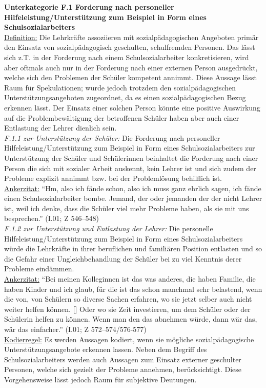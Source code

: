 \textbf{Unterkategorie F.1 Forderung nach personeller Hilfeleistung/Unterstützung zum Beispiel in Form eines Schulsozialarbeiters}\\
\underline{Definition:} Die Lehrkräfte assoziieren mit sozialpädagogischen Angeboten primär den Einsatz von sozialpädagogisch geschulten, schulfremden Personen. Das lässt sich z.T. in der Forderung nach einem Schulsozialarbeiter konkretisieren, wird aber oftmals auch nur in der Forderung nach einer externen Person ausgedrückt, welche sich den Problemen der Schüler kompetent annimmt. Diese Aussage lässt Raum für Spekulationen; wurde jedoch trotzdem den sozialpädagogischen Unterstützungsangeboten zugeordnet, da es einen sozialpädagogischen Bezug erkennen lässt. Der Einsatz einer solchen Person könnte eine positive Auswirkung auf die Problembewältigung der betroffenen Schüler haben aber auch einer Entlastung der Lehrer dienlich sein.\\
\textit{F.1.1 zur Unterstützung der Schüler:} Die Forderung nach personeller Hilfeleistung/Unterstützung zum Beispiel in Form eines Schulsozialarbeiters zur Unterstützung der Schüler und Schülerinnen beinhaltet die Forderung nach einer Person die sich mit sozialer Arbeit auskennt, kein Lehrer ist und sich zudem der Probleme explizit annimmt bzw. bei der Problemlösung behilflich ist.\\
\underline{Ankerzitat:} "`Hm, also ich fände schon, also ich muss ganz ehrlich sagen, ich fände einen Schulsozialarbeiter bombe. Jemand, der oder jemanden der der nicht Lehrer ist, weil ich denke, dass die Schüler viel mehr Probleme haben, als sie mit uns besprechen."' (I.01; Z 546--548)\\
\textit{F.1.2 zur Unterstützung und Entlastung der Lehrer:} Die personelle Hilfeleistung/Unterstützung zum Beispiel in Form eines Schulsozialarbeiters würde die Lehrkräfte in ihrer beruflichen und familiären Position entlasten und so die Gefahr einer Ungleichbehandlung der Schüler bei zu viel Kenntnis derer Probleme eindämmen.\\
\underline{Ankerzitat:} "`Bei meinen Kolleginnen ist das was anderes, die haben Familie, die haben Kinder und ich glaub, für die ist das schon manchmal sehr belastend, wenn die von, von Schülern so diverse Sachen erfahren, wo sie jetzt selber auch nicht weiter helfen können. [\punkte] Oder wo sie Zeit investieren, um dem Schüler oder der Schülerin helfen zu können. Wenn man den das abnehmen würde, dann wär das, wär das einfacher."' (I.01; Z 572--574/576-577)\\
\underline{Kodierregel:} Es werden Aussagen kodiert, wenn sie mögliche sozialpädagogische Unterstützungsangebote erkennen lassen. Neben dem Begriff des Schulsozialarbeiters werden auch Aussagen zum Einsatz externer geschulter Personen, welche sich gezielt der Probleme annehmen, berücksichtigt. Diese Vorgehensweise lässt jedoch Raum für subjektive Deutungen.\\

